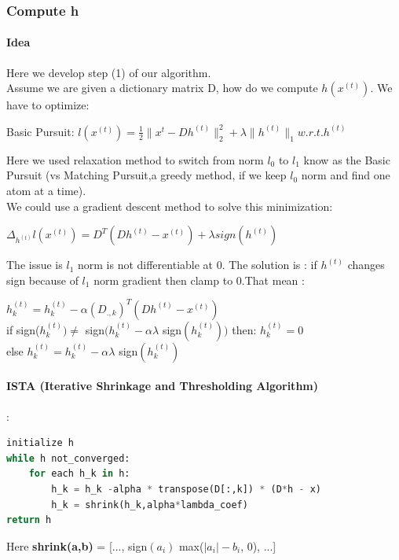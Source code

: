 \documentclass[a4paper,10pt]{article}
\begin{document}
\subsubsection{Compute h }
\paragraph{Idea}
Here we develop  step (1) of our algorithm.\\
Assume we are given a dictionary matrix D, how do we compute $h(x^{(t)})$. We have to optimize:
\begin{center}  Basic Pursuit:
$l(x^{(t)}) = \frac{1}{2} \| x^{t}- D h^{(t)} \|^{2}_{2} + \lambda \|h^{(t)}\|_1 w.r.t. h^{(t)}$\\ 
\end{center} 
Here we used relaxation method to switch from norm $l_0$ to $l_1$ know as the  Basic Pursuit (vs Matching Pursuit,a greedy method,  if we keep $l_0$ norm and find one atom at a time).\\
We could use a gradient descent method to solve this minimization:\\
\begin{center}
$\Delta_{h^{(t)}} l(x^{(t)}) = D^T (D h^{(t)} - x^{(t)}) + \lambda sign(h^{(t)})$
\end{center}
The issue is $l_1$ norm is not differentiable at 0. The solution is : if $h^{(t)}$ changes sign because of $l_1$ norm gradient then clamp to 0.That mean :

$h^{(t)}_k = h^{(t)}_k   - \alpha (D_{., k})^T (D h^{(t)} - x^{(t)})$\\
\indent if  sign($h^{(t)}_k) \neq$ sign$(h^{(t)}_k - \alpha \lambda$ sign$(h^{(t)}_k) )$ then: $h^{(t)}_k = 0$\\
\indent else $h^{(t)}_k = h^{(t)}_k - \alpha \lambda$ sign$(h^{(t)}_k)$
\paragraph{ISTA (Iterative Shrinkage and Thresholding Algorithm)}
:
\begin{lstlisting}[language=Python,frame=single]
initialize h 
while h not_converged:
    for each h_k in h:
        h_k = h_k -alpha * transpose(D[:,k]) * (D*h - x)
        h_k = shrink(h_k,alpha*lambda_coef)
return h
\end{lstlisting}
Here \textbf{shrink(a,b) }= [..., sign$(a_i)$ max($|a_i| - b_i$, 0), ...]\\
\end{document}
